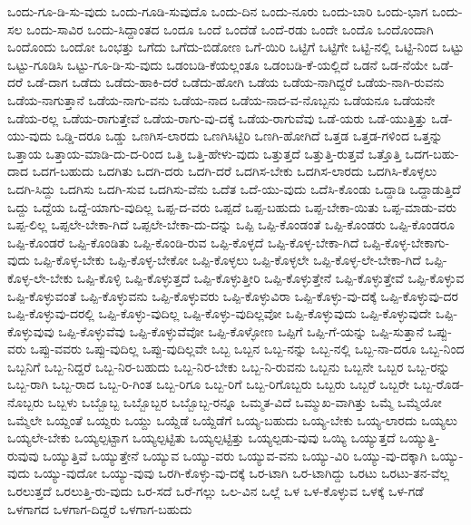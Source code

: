 {ಒಂದು-ಗೂ-ಡಿ-ಸು-ವುದು
ಒಂದು-ಗೂಡಿ-ಸುವುದೊ
ಒಂದು-ದಿನ
ಒಂದು-ನೂರು
ಒಂದು-ಬಾರಿ
ಒಂದು-ಭಾಗ
ಒಂದು-ಸಲ
ಒಂದು-ಸಾವಿರ
ಒಂದು-ಸಿದ್ದಾಂತದ
ಒಂದೂ
ಒಂದೆ
ಒಂದೆಡೆ
ಒಂದೆ-ರಡು
ಒಂದೇ
ಒಂದೊ
ಒಂದೊಂದಾಗಿ
ಒಂದೊಂದು
ಒಂದೋ
ಒಂಭತ್ತು
ಒಗೆದು
ಒಗೆದು-ಬಿಡೋಣ
ಒಗೆ-ಯಿರಿ
ಒಟ್ಟಿಗೆ
ಒಟ್ಟಿಗೇ
ಒಟ್ಟಿ-ನಲ್ಲಿ
ಒಟ್ಟಿ-ನಿಂದ
ಒಟ್ಟು
ಒಟ್ಟು-ಗೂಡಿಸಿ
ಒಟ್ಟು-ಗೂ-ಡಿ-ಸು-ವುದು
ಒಡಂಬಡಿ-ಕೆಯಲ್ಲಂತೂ
ಒಡಂಬಡಿ-ಕೆ-ಯಲ್ಲಿದೆ
ಒಡನೆ
ಒಡ-ನೆಯೇ
ಒಡೆ-ದರೆ
ಒಡೆ-ದಾಗ
ಒಡೆದು
ಒಡೆದು-ಹಾಕಿ-ದರೆ
ಒಡೆದು-ಹೋಗಿ
ಒಡೆಯ
ಒಡೆಯ-ನಾಗಿದ್ದರೆ
ಒಡೆಯ-ನಾಗಿ-ರುವನು
ಒಡೆಯ-ನಾಗುತ್ತಾನೆ
ಒಡೆಯ-ನಾಗು-ವನು
ಒಡೆಯ-ನಾದ
ಒಡೆಯ-ನಾದ-ವ-ನೊಬ್ಬನು
ಒಡೆಯನೂ
ಒಡೆಯನೇ
ಒಡೆಯ-ರಲ್ಲ
ಒಡೆಯ-ರಾಗುತ್ತೇವೆ
ಒಡೆಯ-ರಾಗು-ವು-ದಕ್ಕೆ
ಒಡೆಯ-ರಾಗುವೆವು
ಒಡೆ-ಯರು
ಒಡೆ-ಯುತ್ತಿತ್ತು
ಒಡೆ-ಯು-ವುದು
ಒಡ್ಡಿ-ದರೂ
ಒಡ್ಡು
ಒಣಗಿಸ-ಲಾರದು
ಒಣಗಿಸಿಟ್ಟಿರಿ
ಒಣಗಿ-ಹೋಗಿದೆ
ಒತ್ತಡ
ಒತ್ತಡ-ಗಳಿಂದ
ಒತ್ತನ್ನು
ಒತ್ತಾಯ
ಒತ್ತಾಯ-ಮಾಡಿ-ದು-ದ-ರಿಂದ
ಒತ್ತಿ
ಒತ್ತಿ-ಹೇಳು-ವುದು
ಒತ್ತುತ್ತದೆ
ಒತ್ತುತ್ತಿ-ರುತ್ತವೆ
ಒತ್ತೊತ್ತಿ
ಒದಗ-ಬಹು-ದಾದ
ಒದಗ-ಬಹುದು
ಒದಗಿತು
ಒದಗಿ-ದರು
ಒದಗಿ-ದರೆ
ಒದಗಿಸ-ಬೇಕು
ಒದಗಿಸ-ಲಾರದು
ಒದಗಿಸಿ-ಕೊಳ್ಳಲು
ಒದಗಿ-ಸಿದ್ದು
ಒದಗಿಸು
ಒದಗಿ-ಸುವ
ಒದಗಿಸು-ವೆನು
ಒದೆತ
ಒದೆ-ಯು-ವುದು
ಒದೆಸಿ-ಕೊಂಡು
ಒದ್ದಾಡಿ
ಒದ್ದಾಡುತ್ತಿದೆ
ಒದ್ದು
ಒದ್ದೆಯ
ಒದ್ದೆ-ಯಾಗು-ವುದಿಲ್ಲ
ಒಪ್ಪ-ದ-ವರು
ಒಪ್ಪದೆ
ಒಪ್ಪ-ಬಹುದು
ಒಪ್ಪ-ಬೇಕಾ-ಯಿತು
ಒಪ್ಪ-ಮಾಡು-ವರು
ಒಪ್ಪ-ಲಿಲ್ಲ
ಒಪ್ಪಲೇ-ಬೇಕಾ-ಗಿದೆ
ಒಪ್ಪಲೇ-ಬೇಕಾ-ದು-ದನ್ನು
ಒಪ್ಪಿ
ಒಪ್ಪಿ-ಕೊಂಡಂತೆ
ಒಪ್ಪಿ-ಕೊಂಡರು
ಒಪ್ಪಿ-ಕೊಂಡರೂ
ಒಪ್ಪಿ-ಕೊಂಡರೆ
ಒಪ್ಪಿ-ಕೊಂಡಿತು
ಒಪ್ಪಿ-ಕೊಂಡಿ-ರುವ
ಒಪ್ಪಿ-ಕೊಳ್ಳದೆ
ಒಪ್ಪಿ-ಕೊಳ್ಳ-ಬೇಕಾ-ಗಿದೆ
ಒಪ್ಪಿ-ಕೊಳ್ಳ-ಬೇಕಾಗು-ವುದು
ಒಪ್ಪಿ-ಕೊಳ್ಳ-ಬೇಕು
ಒಪ್ಪಿ-ಕೊಳ್ಳ-ಬೇಕೋ
ಒಪ್ಪಿ-ಕೊಳ್ಳಲು
ಒಪ್ಪಿ-ಕೊಳ್ಳಲೇ
ಒಪ್ಪಿ-ಕೊಳ್ಳ-ಲೇ-ಬೇಕಾ-ಗಿದೆ
ಒಪ್ಪಿ-ಕೊಳ್ಳ-ಲೇ-ಬೇಕು
ಒಪ್ಪಿ-ಕೊಳ್ಳಿ
ಒಪ್ಪಿ-ಕೊಳ್ಳುತ್ತದೆ
ಒಪ್ಪಿ-ಕೊಳ್ಳುತ್ತೀರಿ
ಒಪ್ಪಿ-ಕೊಳ್ಳುತ್ತೇನೆ
ಒಪ್ಪಿ-ಕೊಳ್ಳುತ್ತೇವೆ
ಒಪ್ಪಿ-ಕೊಳ್ಳುವ
ಒಪ್ಪಿ-ಕೊಳ್ಳುವಂತೆ
ಒಪ್ಪಿ-ಕೊಳ್ಳುವನು
ಒಪ್ಪಿ-ಕೊಳ್ಳುವರು
ಒಪ್ಪಿ-ಕೊಳ್ಳುವಿರಾ
ಒಪ್ಪಿ-ಕೊಳ್ಳು-ವು-ದಕ್ಕೆ
ಒಪ್ಪಿ-ಕೊಳ್ಳುವು-ದರ
ಒಪ್ಪಿ-ಕೊಳ್ಳುವು-ದರಲ್ಲಿ
ಒಪ್ಪಿ-ಕೊಳ್ಳು-ವುದಿಲ್ಲ
ಒಪ್ಪಿ-ಕೊಳ್ಳು-ವುದಿಲ್ಲವೋ
ಒಪ್ಪಿ-ಕೊಳ್ಳುವುದು
ಒಪ್ಪಿ-ಕೊಳ್ಳುವುದೇ
ಒಪ್ಪಿ-ಕೊಳ್ಳುವುವು
ಒಪ್ಪಿ-ಕೊಳ್ಳುವೆವು
ಒಪ್ಪಿ-ಕೊಳ್ಳುವೆವೋ
ಒಪ್ಪಿ-ಕೊಳ್ಳೋಣ
ಒಪ್ಪಿಗೆ
ಒಪ್ಪಿ-ಗೆ-ಯನ್ನು
ಒಪ್ಪಿ-ಸುತ್ತಾನೆ
ಒಪ್ಪು-ವರು
ಒಪ್ಪು-ವವರು
ಒಪ್ಪು-ವುದಿಲ್ಲ
ಒಪ್ಪು-ವುದಿಲ್ಲವೇ
ಒಬ್ಬ
ಒಬ್ಬನ
ಒಬ್ಬ-ನನ್ನು
ಒಬ್ಬ-ನಲ್ಲಿ
ಒಬ್ಬ-ನಾ-ದರೂ
ಒಬ್ಬ-ನಿಂದ
ಒಬ್ಬನಿಗೆ
ಒಬ್ಬ-ನಿದ್ದರೆ
ಒಬ್ಬ-ನಿರ-ಬಹುದು
ಒಬ್ಬ-ನಿರ-ಬೇಕು
ಒಬ್ಬ-ನಿ-ರುವನು
ಒಬ್ಬನು
ಒಬ್ಬನೇ
ಒಬ್ಬರ
ಒಬ್ಬ-ರನ್ನು
ಒಬ್ಬ-ರಾಗಿ
ಒಬ್ಬ-ರಾದ
ಒಬ್ಬ-ರಿ-ಗಿಂತ
ಒಬ್ಬ-ರಿಗೂ
ಒಬ್ಬ-ರಿಗೆ
ಒಬ್ಬ-ರಿಗೊಬ್ಬರು
ಒಬ್ಬರು
ಒಬ್ಬರೆ
ಒಬ್ಬರೇ
ಒಬ್ಬ-ರೊಡ-ನೊಬ್ಬರು
ಒಬ್ಬಳು
ಒಬ್ಬೊಬ್ಬ
ಒಬ್ಬೊಬ್ಬರ
ಒಬ್ಬೊಬ್ಬ-ರನ್ನೂ
ಒಮ್ಮತ-ವಿದೆ
ಒಮ್ಮುಖ-ವಾಗಿತ್ತು
ಒಮ್ಮೆ
ಒಮ್ಮೆಯೋ
ಒಮ್ಮೆಲೇ
ಒಯ್ದಂತೆ
ಒಯ್ದರು
ಒಯ್ದು
ಒಯ್ದೆಡೆ
ಒಯ್ದೆಡೆಗೆ
ಒಯ್ಯ-ಬಹುದು
ಒಯ್ಯ-ಬೇಕು
ಒಯ್ಯ-ಲಾರದು
ಒಯ್ಯಲು
ಒಯ್ಯಲೇ-ಬೇಕು
ಒಯ್ಯಲ್ಪಟ್ಟಾಗ
ಒಯ್ಯಲ್ಪಟ್ಟಿತು
ಒಯ್ಯಲ್ಪಟ್ಟಿತ್ತು
ಒಯ್ಯಲ್ಪಡು-ವುವು
ಒಯ್ಯಿ
ಒಯ್ಯುತ್ತದೆ
ಒಯ್ಯುತ್ತಿ-ರುವುವು
ಒಯ್ಯುತ್ತಿವೆ
ಒಯ್ಯುತ್ತೇನೆ
ಒಯ್ಯುವ
ಒಯ್ಯು-ವರು
ಒಯ್ಯುವ-ವನು
ಒಯ್ಯು-ವಿರಿ
ಒಯ್ಯು-ವು-ದಕ್ಕಾಗಿ
ಒಯ್ಯು-ವುದು
ಒಯ್ಯು-ವುದೋ
ಒಯ್ಯು-ವುವು
ಒರಗಿ-ಕೊಳ್ಳು-ವು-ದಕ್ಕೆ
ಒರ-ಟಾಗಿ
ಒರ-ಟಾಗಿದ್ದು
ಒರಟು
ಒರಟು-ತನ-ವೆಲ್ಲ
ಒರಲುತ್ತದೆ
ಒರಲುತ್ತಿ-ರು-ವುದು
ಒರ-ಸದೆ
ಒರೆ-ಗಲ್ಲು
ಒಲ-ವಿನ
ಒಲ್ಲೆ
ಒಳ
ಒಳ-ಕೊಳ್ಳುವ
ಒಳಕ್ಕೆ
ಒಳ-ಗಡೆ
ಒಳಗಾಗದ
ಒಳಗಾಗ-ದಿದ್ದರೆ
ಒಳಗಾಗ-ಬಹುದು
}
